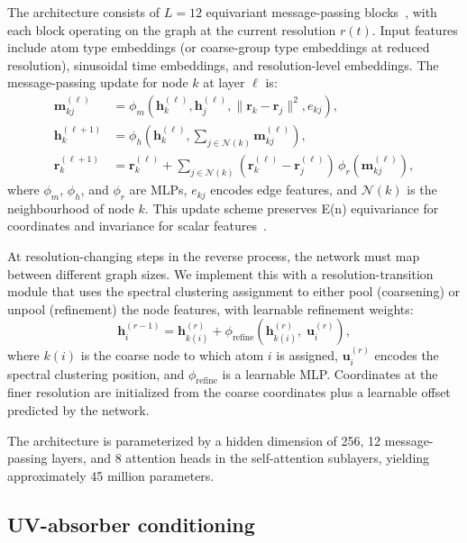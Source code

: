 \documentclass[11pt]{article}
\begin{document}
The architecture consists of $L = 12$ equivariant message-passing blocks~\cite{satorras2021egnn, schutt2021equivariant}, with each block operating on the graph at the current resolution $r(t)$. Input features include atom type embeddings (or coarse-group type embeddings at reduced resolution), sinusoidal time embeddings, and resolution-level embeddings. The message-passing update for node $k$ at layer $\ell$ is:
\begin{align}
    \mathbf{m}_{kj}^{(\ell)} &= \phi_m\!\left(\mathbf{h}_k^{(\ell)}, \mathbf{h}_j^{(\ell)}, \|\mathbf{r}_k - \mathbf{r}_j\|^2, e_{kj}\right), \\
    \mathbf{h}_k^{(\ell+1)} &= \phi_h\!\left(\mathbf{h}_k^{(\ell)}, \sum_{j \in \mathcal{N}(k)} \mathbf{m}_{kj}^{(\ell)}\right), \\
    \mathbf{r}_k^{(\ell+1)} &= \mathbf{r}_k^{(\ell)} + \sum_{j \in \mathcal{N}(k)} (\mathbf{r}_k^{(\ell)} - \mathbf{r}_j^{(\ell)})\,\phi_r\!\left(\mathbf{m}_{kj}^{(\ell)}\right),
\end{align}
where $\phi_m$, $\phi_h$, and $\phi_r$ are MLPs, $e_{kj}$ encodes edge features, and $\mathcal{N}(k)$ is the neighbourhood of node $k$. This update scheme preserves E(n) equivariance for coordinates and invariance for scalar features~\cite{satorras2021egnn}.

At resolution-changing steps in the reverse process, the network must map between different graph sizes. We implement this with a resolution-transition module that uses the spectral clustering assignment to either pool (coarsening) or unpool (refinement) the node features, with learnable refinement weights:
\begin{equation}
    \mathbf{h}_i^{(r-1)} = \mathbf{h}_{k(i)}^{(r)} + \phi_{\text{refine}}\!\left(\mathbf{h}_{k(i)}^{(r)},\; \mathbf{u}_i^{(r)}\right),
\end{equation}
where $k(i)$ is the coarse node to which atom $i$ is assigned, $\mathbf{u}_i^{(r)}$ encodes the spectral clustering position, and $\phi_{\text{refine}}$ is a learnable MLP. Coordinates at the finer resolution are initialized from the coarse coordinates plus a learnable offset predicted by the network.

The architecture is parameterized by a hidden dimension of 256, 12 message-passing layers, and 8 attention heads in the self-attention sublayers, yielding approximately 45 million parameters.


\subsection*{UV-absorber conditioning}
\end{document}
